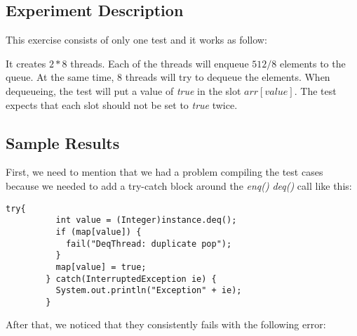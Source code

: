 \subsection{Experiment Description}
\par
This exercise consists of only one test and it works as follow:
\par
It creates $2*8$ threads. Each of the threads will enqueue $512/8$ elements to
the queue. At the same time, $8$ threads will try to dequeue the elements. When
dequeueing, the test will put a value of \textit{true} in the slot
$arr[value]$. The test expects that each slot should not be set to
\textit{true} twice.
\par
\subsection{Sample Results}
\par
First, we need to mention that we had a problem compiling the test cases because
we needed to add a try-catch block around the \textit{enq()} \textit{deq()}
call like this:
\par
\hfill
\begin{lstlisting}[style=numbers]
        try{
          int value = (Integer)instance.deq();
          if (map[value]) {
            fail("DeqThread: duplicate pop");
          }
          map[value] = true;                                                                                                                                                         
        } catch(InterruptedException ie) {
          System.out.println("Exception" + ie);
        }
\end{lstlisting}
\hfill
\par
After that, we noticed that they consistently fails with the following error:
\par
\hfill
